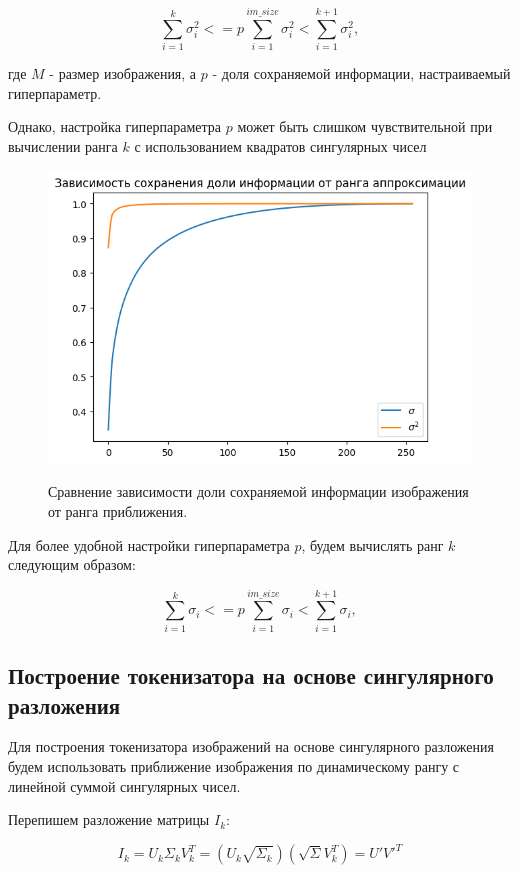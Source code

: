 \documentclass[times,specification,annotation]{itmo-student-thesis}
\begin{document}
$$
    \sum_{i=1}^{k} \sigma_i^2 <= p\sum_{i=1}^{im\_size} \sigma_i^2 < \sum_{i=1}^{k+1} \sigma_i^2,
$$

где $M$ - размер изображения, а $p$ - доля сохраняемой информации, настраиваемый гиперпараметр.

Однако, настройка гиперпараметра $p$ может быть слишком чувствительной при вычислении ранга $k$ с использованием квадратов сингулярных чисел

\begin{figure}[H]
    \centering
    \includegraphics[width=1.0\textwidth]
    {images/solutions_analysis/svd/svd_lin_vs_square.png}
    \label{fig:svd_lin_vs_square}
    \caption{Сравнение зависимости доли сохраняемой информации изображения от ранга приближения.}
\end{figure}

Для более удобной настройки гиперпараметра $p$, будем вычислять ранг $k$ следующим образом:

$$
    \sum_{i=1}^{k} \sigma_i <= p\sum_{i=1}^{im\_size} \sigma_i < \sum_{i=1}^{k+1} \sigma_i,
$$

\subsection{Построение токенизатора на основе сингулярного разложения}

Для построения токенизатора изображений на основе сингулярного разложения будем использовать приближение изображения по динамическому рангу с линейной суммой сингулярных чисел.

Перепишем разложение матрицы $I_k$:

$$
I_k = U_k\Sigma_kV_k^T = (U_k\sqrt{\Sigma_k})(\sqrt{\Sigma}V_k^T) = U'V'^T
$$
\end{document}
